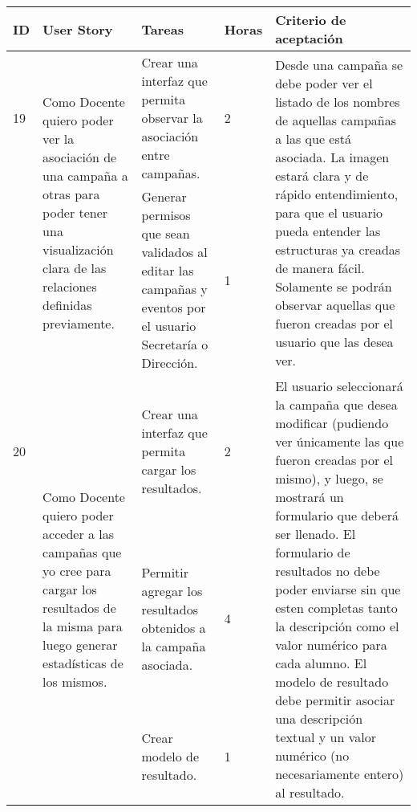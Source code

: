 \documentclass[a4paper, 11pt]{article}
\begin{document}
\begin{table}[H]
\centering
\begin{tabular}{ | p{0.5cm} | p{4cm} | p{5cm} | p{0.85cm} | p{5cm} |}
\hline 
ID & User Story & Tareas & Horas & Criterio de aceptación \\ \hline \hline

19 & \multirow{2}{4cm}{Como Docente quiero poder ver la asociación de una campaña a otras para poder tener una visualización clara de las relaciones definidas previamente.} & Crear una interfaz que permita observar la asociación entre campañas. & 2  & \multirow{2}{5cm}{Desde una campaña se debe poder ver el listado de los nombres de aquellas campañas a las que está asociada. La imagen estará clara y de rápido entendimiento, para que el usuario pueda entender las estructuras ya creadas de manera fácil. Solamente se podrán observar aquellas que fueron creadas por el usuario que las desea ver.} \\[3cm] \cline{3-4}
& & Generar permisos que sean validados al editar las campañas y eventos por el usuario Secretaría o Dirección. & 1 & \\[3cm] \hline


20 & \multirow{3}{4cm}{Como Docente quiero poder acceder a las campañas que yo cree para cargar los resultados de la misma para luego generar estadísticas de los mismos.} & Crear una interfaz que permita cargar los resultados. & 2 & \multirow{3}{5cm}{El usuario seleccionará la campaña que desea modificar (pudiendo ver únicamente las que fueron creadas por el mismo), y luego, se mostrará un formulario que deberá ser llenado. El formulario de resultados no debe poder enviarse sin que esten completas tanto la descripción como el valor numérico para cada alumno. El modelo de resultado debe permitir asociar una descripción textual y un valor numérico (no necesariamente entero) al resultado.} \\[2.4cm] \cline{3-4}
& & Permitir agregar los resultados obtenidos a la campaña asociada. & 4 & \\[2.4cm] \cline{3-4}
& & Crear modelo de resultado. & 1 & \\[2.5cm] \hline

\end{tabular}
\end{table}
\end{document}
